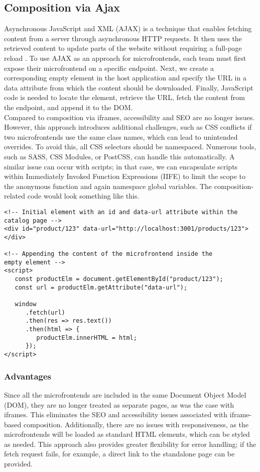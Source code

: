 \subsection{Composition via Ajax}
Asynchronous JavaScript and XML (AJAX) is a technique that enables fetching content from a server through asynchronous HTTP requests. It then uses the retrieved content to update parts of the website without requiring a full-page reload \cite{Ajax}. To use AJAX as an approach for microfrontends, each team must first expose their microfrontend on a specific endpoint. Next, we create a corresponding empty element in the host application and specify the URL in a data attribute from which the content should be downloaded. Finally, JavaScript code is needed to locate the element, retrieve the URL, fetch the content from the endpoint, and append it to the DOM.\\

\noindent
Compared to composition via iframes, accessibility and SEO are no longer issues. However, this approach introduces additional challenges, such as CSS conflicts if two microfrontends use the same class names, which can lead to unintended overrides. To avoid this, all CSS selectors should be namespaced. Numerous tools, such as SASS, CSS Modules, or PostCSS, can handle this automatically. A similar issue can occur with scripts; in that case, we can encapsulate scripts within Immediately Invoked Function Expressions (IIFE) to limit the scope to the anonymous function and again namespace global variables. \cite{Geers} The composition-related code would look something like this.
\begin{verbatim}
<!-- Initial element with an id and data-url attribute within the
catalog page -->
<div id="product/123" data-url="http://localhost:3001/products/123">
</div>
               
<!-- Appending the content of the microfrontend inside the 
empty element -->
<script>
   const productElm = document.getElementById("product/123");
   const url = productElm.getAttribute("data-url");

   window
      .fetch(url)
      .then(res => res.text())
      .then(html => {
         productElm.innerHTML = html;
      });
</script>
\end{verbatim}

\subsubsection{Advantages}
Since all the microfrontends are included in the same Document Object Model (DOM), they are no longer treated as separate pages, as was the case with iframes. This eliminates the SEO and accessibility issues associated with iframe-based composition. Additionally, there are no issues with responsiveness, as the microfrontends will be loaded as standard HTML elements, which can be styled as needed. This approach also provides greater flexibility for error handling; if the fetch request fails, for example, a direct link to the standalone page can be provided. \cite{Geers}

